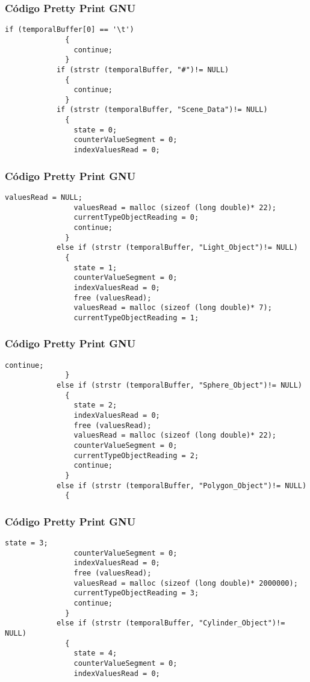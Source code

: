\documentclass{beamer}
\begin{document}
\begin{frame}[fragile]
\frametitle{C\'odigo Pretty Print GNU}
\begin{lstlisting}[style=CStyle]
            if (temporalBuffer[0] == '\t')
              {
                continue;
              }
            if (strstr (temporalBuffer, "#")!= NULL)
              {
                continue;
              }
            if (strstr (temporalBuffer, "Scene_Data")!= NULL)
              {
                state = 0;
                counterValueSegment = 0;
                indexValuesRead = 0;
\end{lstlisting}
\end{frame}
\begin{frame}[fragile]
\frametitle{C\'odigo Pretty Print GNU}
\begin{lstlisting}[style=CStyle]
                valuesRead = NULL;
                valuesRead = malloc (sizeof (long double)* 22);
                currentTypeObjectReading = 0;
                continue;
              }
            else if (strstr (temporalBuffer, "Light_Object")!= NULL)
              {
                state = 1;
                counterValueSegment = 0;
                indexValuesRead = 0;
                free (valuesRead);
                valuesRead = malloc (sizeof (long double)* 7);
                currentTypeObjectReading = 1;
\end{lstlisting}
\end{frame}
\begin{frame}[fragile]
\frametitle{C\'odigo Pretty Print GNU}
\begin{lstlisting}[style=CStyle]
                continue;
              }
            else if (strstr (temporalBuffer, "Sphere_Object")!= NULL)
              {
                state = 2;
                indexValuesRead = 0;
                free (valuesRead);
                valuesRead = malloc (sizeof (long double)* 22);
                counterValueSegment = 0;
                currentTypeObjectReading = 2;
                continue;
              }
            else if (strstr (temporalBuffer, "Polygon_Object")!= NULL)
              {
                \end{lstlisting}
\end{frame}
\begin{frame}[fragile]
\frametitle{C\'odigo Pretty Print GNU}
\begin{lstlisting}[style=CStyle]
                state = 3;
                counterValueSegment = 0;
                indexValuesRead = 0;
                free (valuesRead);
                valuesRead = malloc (sizeof (long double)* 2000000);
                currentTypeObjectReading = 3;
                continue;
              }
            else if (strstr (temporalBuffer, "Cylinder_Object")!= NULL)
              {
                state = 4;
                counterValueSegment = 0;
                indexValuesRead = 0;
\end{lstlisting}
\end{frame}
\end{document}

